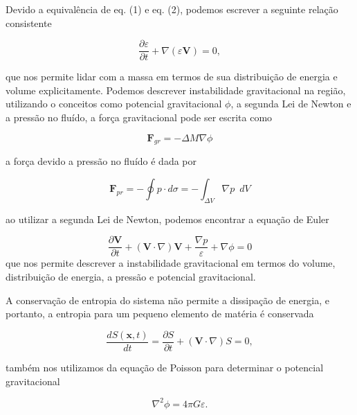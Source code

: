 Devido a equivalência de eq. (1) e eq. (2), podemos escrever a seguinte relação consistente

\begin{equation}\label{eq3}
	\frac{\partial \varepsilon}{\partial t} + \nabla (\varepsilon\mathbf{V}) = 0,
\end{equation}

que nos permite lidar com a massa em termos de sua distribuição de energia e volume explicitamente. Podemos descrever instabilidade gravitacional na região, utilizando o conceitos como potencial gravitacional $\phi$, a segunda Lei de Newton e a pressão no fluído, a força gravitacional pode ser escrita como

\begin{equation}\label{eq4}
	\textbf{F}_{gr} = - \Delta M \nabla\phi
\end{equation}

a força devido a pressão no fluído é dada por 

\begin{equation}\label{eq5}
	\textbf{F}_{pr} = - \oint p \cdot d\sigma = - \int_{\Delta V} \nabla p\,\,\, dV
\end{equation}

ao utilizar a segunda Lei de Newton, podemos encontrar a equação de Euler

\begin{equation}\label{eq6}
	\dfrac{\partial \textbf{V}}{\partial t} + (\textbf{V} \cdot \nabla) \textbf{V} + \dfrac{\nabla p}{\varepsilon} + \nabla\phi = 0
\end{equation}
 que nos permite descrever a instabilidade gravitacional em termos do volume, distribuição de energia, a pressão e potencial gravitacional.
 
 A conservação de entropia do sistema não permite a dissipação de energia, e portanto, a entropia para um pequeno elemento de matéria é conservada
 
 \begin{equation}\label{eq7}
 	\dfrac{d S(\textbf{x},t)}{dt} = \dfrac{\partial S}{\partial t} + (\textbf{V} \cdot \nabla) S = 0,
 \end{equation} 
 
 também nos utilizamos da equação de Poisson para determinar o potencial gravitacional
 
 \begin{equation}\label{eq8}
 	\nabla^2\phi = 4\pi G\varepsilon.
 \end{equation}

